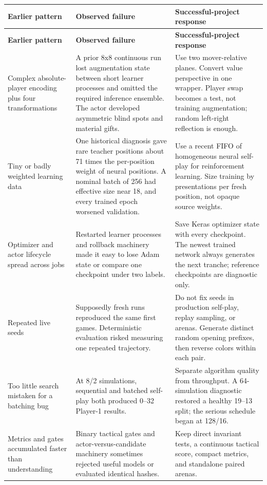 \documentclass[10.5pt,letterpaper]{article}
\begin{document}
\small
\begin{longtable}{L{0.19\textwidth} L{0.38\textwidth} L{0.35\textwidth}}
\toprule
\sffamily\bfseries Earlier pattern &
\sffamily\bfseries Observed failure &
\sffamily\bfseries Successful-project response \\
\midrule
\endfirsthead
\toprule
\sffamily\bfseries Earlier pattern &
\sffamily\bfseries Observed failure &
\sffamily\bfseries Successful-project response \\
\midrule
\endhead
Complex absolute-player encoding plus four transformations &
A prior 8x8 continuous run lost augmentation state between short learner
processes and omitted the required inference ensemble. The actor developed
asymmetric blind spots and material gifts. &
Use two mover-relative planes. Convert value perspective in one wrapper.
Player swap becomes a test, not training augmentation; random left-right
reflection is enough. \\
\addlinespace
Tiny or badly weighted learning data &
One historical diagnosis gave rare teacher positions about 71 times the
per-position weight of neural positions. A nominal batch of 256 had effective
size near 18, and every trained epoch worsened validation. &
Use a recent FIFO of homogeneous neural self-play for reinforcement learning.
Size training by presentations per fresh position, not opaque source weights. \\
\addlinespace
Optimizer and actor lifecycle spread across jobs &
Restarted learner processes and rollback machinery made it easy to lose Adam
state or compare one checkpoint under two labels. &
Save Keras optimizer state with every checkpoint. The newest trained network
always generates the next tranche; reference checkpoints are diagnostic only. \\
\addlinespace
Repeated live seeds &
Supposedly fresh runs reproduced the same first games. Deterministic evaluation
risked measuring one repeated trajectory. &
Do not fix seeds in production self-play, replay sampling, or arenas. Generate
distinct random opening prefixes, then reverse colors within each pair. \\
\addlinespace
Too little search mistaken for a batching bug &
At 8/2 simulations, sequential and batched self-play both produced 0--32
Player-1 results. &
Separate algorithm quality from throughput. A 64-simulation diagnostic restored
a healthy 19--13 split; the serious schedule began at 128/16. \\
\addlinespace
Metrics and gates accumulated faster than understanding &
Binary tactical gates and actor-versus-candidate machinery sometimes rejected
useful models or evaluated identical hashes. &
Keep direct invariant tests, a continuous tactical score, compact metrics, and
standalone paired arenas. \\
\bottomrule
\end{longtable}
\normalsize
\end{document}
